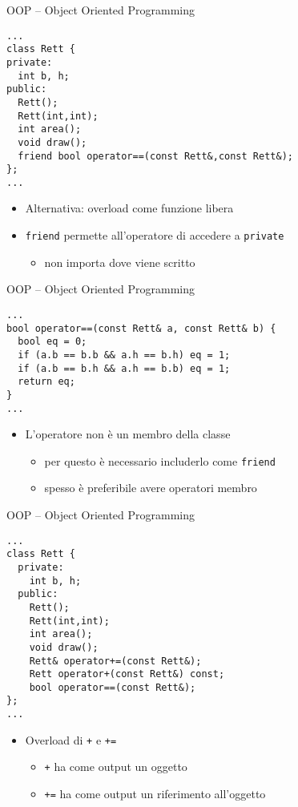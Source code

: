\begin{frame}[fragile]{OOP -- Object Oriented Programming}
  \vfill
  \begin{lstlisting}[firstnumber=2]
...
class Rett {
private:
  int b, h;
public:
  Rett();
  Rett(int,int);
  int area();
  void draw();
  friend bool operator==(const Rett&,const Rett&);
};
...\end{lstlisting}
  \vfill
  \begin{itemize}
    \item Alternativa: overload come funzione \alert{libera}
    \vfill
    \item \lstinline$friend$ permette all'operatore di accedere a \lstinline$private$
    \begin{itemize}
      \item non importa dove viene scritto
    \end{itemize}
  \end{itemize}
  \vfill
\end{frame}

\begin{frame}[fragile]{OOP -- Object Oriented Programming}
  \vfill
  \begin{lstlisting}[firstnumber=37]
...
bool operator==(const Rett& a, const Rett& b) {
  bool eq = 0;
  if (a.b == b.b && a.h == b.h) eq = 1;
  if (a.b == b.h && a.h == b.b) eq = 1;
  return eq;
}
...\end{lstlisting}
  \vfill
  \begin{itemize}
    \item L'operatore \alert{non} è un membro della classe
    \begin{itemize}
      \item per questo è necessario includerlo come \lstinline$friend$
      \item spesso è preferibile avere operatori membro
    \end{itemize}
  \end{itemize}
  \vfill
\end{frame}

\begin{frame}[fragile]{OOP -- Object Oriented Programming}
  \vfill
  \begin{lstlisting}[firstnumber=2]
...
class Rett {
  private:
    int b, h;
  public:
    Rett();
    Rett(int,int);
    int area();
    void draw();
    Rett& operator+=(const Rett&);
    Rett operator+(const Rett&) const;
    bool operator==(const Rett&);
};
...\end{lstlisting}
  \vfill
  \begin{itemize}
    \item Overload di \lstinline$+$ e \lstinline$+=$
    \begin{itemize}
      \item \lstinline$+$ ha come output un oggetto
      \item \lstinline$+=$ ha come output un riferimento all'oggetto
    \end{itemize}
  \end{itemize}
  \vfill
\end{frame}


